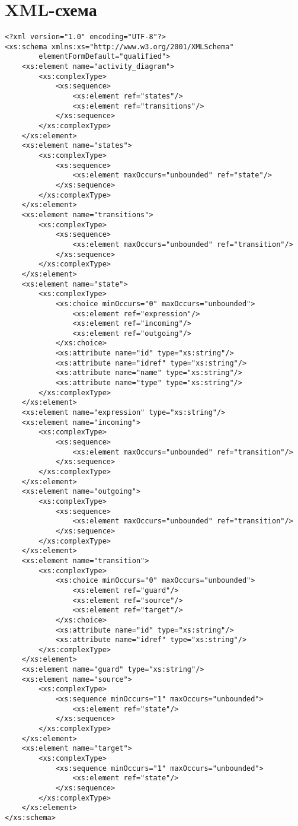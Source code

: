 \chapter{XML-схема}
\label{cha:appendix1}

\begin{verbatim}
<?xml version="1.0" encoding="UTF-8"?>
<xs:schema xmlns:xs="http://www.w3.org/2001/XMLSchema"
        elementFormDefault="qualified">
    <xs:element name="activity_diagram">
        <xs:complexType>
            <xs:sequence>
                <xs:element ref="states"/>
                <xs:element ref="transitions"/>
            </xs:sequence>
        </xs:complexType>
    </xs:element>
    <xs:element name="states">
        <xs:complexType>
            <xs:sequence>
                <xs:element maxOccurs="unbounded" ref="state"/>
            </xs:sequence>
        </xs:complexType>
    </xs:element>
    <xs:element name="transitions">
        <xs:complexType>
            <xs:sequence>
                <xs:element maxOccurs="unbounded" ref="transition"/>
            </xs:sequence>
        </xs:complexType>
    </xs:element>
    <xs:element name="state">
        <xs:complexType>
            <xs:choice minOccurs="0" maxOccurs="unbounded">
                <xs:element ref="expression"/>
                <xs:element ref="incoming"/>
                <xs:element ref="outgoing"/>
            </xs:choice>
            <xs:attribute name="id" type="xs:string"/>
            <xs:attribute name="idref" type="xs:string"/>
            <xs:attribute name="name" type="xs:string"/>
            <xs:attribute name="type" type="xs:string"/>
        </xs:complexType>
    </xs:element>
    <xs:element name="expression" type="xs:string"/>
    <xs:element name="incoming">
        <xs:complexType>
            <xs:sequence>
                <xs:element maxOccurs="unbounded" ref="transition"/>
            </xs:sequence>
        </xs:complexType>
    </xs:element>
    <xs:element name="outgoing">
        <xs:complexType>
            <xs:sequence>
                <xs:element maxOccurs="unbounded" ref="transition"/>
            </xs:sequence>
        </xs:complexType>
    </xs:element>
    <xs:element name="transition">
        <xs:complexType>
            <xs:choice minOccurs="0" maxOccurs="unbounded">
                <xs:element ref="guard"/>
                <xs:element ref="source"/>
                <xs:element ref="target"/>
            </xs:choice>
            <xs:attribute name="id" type="xs:string"/>
            <xs:attribute name="idref" type="xs:string"/>
        </xs:complexType>
    </xs:element>
    <xs:element name="guard" type="xs:string"/>
    <xs:element name="source">
        <xs:complexType>
            <xs:sequence minOccurs="1" maxOccurs="unbounded">
                <xs:element ref="state"/>
            </xs:sequence>
        </xs:complexType>
    </xs:element>
    <xs:element name="target">
        <xs:complexType>
            <xs:sequence minOccurs="1" maxOccurs="unbounded">
                <xs:element ref="state"/>
            </xs:sequence>
        </xs:complexType>
    </xs:element>
</xs:schema>

\end{verbatim}